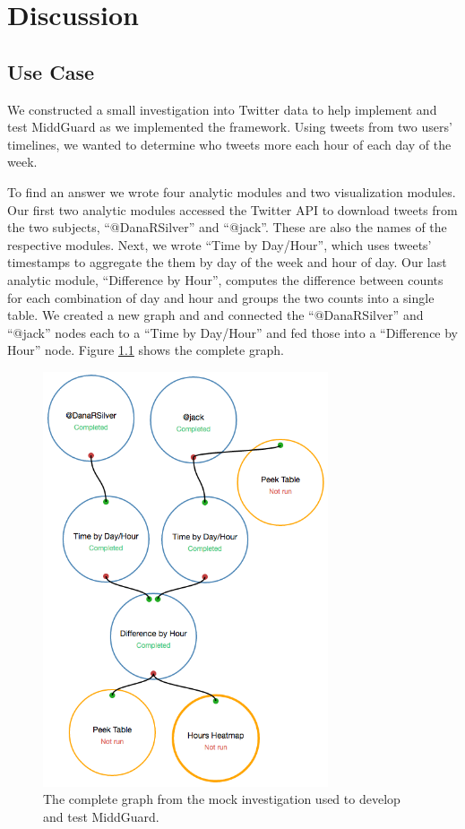 \documentclass[midd]{thesis}
\begin{document}
\chapter{Discussion}

\section{Use Case}

We constructed a small investigation into Twitter data to help implement and
test MiddGuard as we implemented the framework. Using tweets from two users'
timelines, we wanted to determine who tweets more each hour of each day of the
week.

To find an answer we wrote four analytic modules and two visualization modules.
Our first two analytic modules accessed the Twitter API to download tweets from
the two subjects, ``@DanaRSilver'' and ``@jack''. These are also the names of
the respective modules. Next, we wrote ``Time by Day/Hour'', which uses tweets'
timestamps to aggregate the them by day of the week and hour of day. Our last
analytic module, ``Difference by Hour'', computes the difference between counts
for each combination of day and hour and groups the two counts into a single
table. We created a new graph and and connected the ``@DanaRSilver'' and
``@jack'' nodes each to a ``Time by Day/Hour'' and fed those into a ``Difference
by Hour'' node. Figure \ref{fig:tweetanalysisgraph} shows the complete graph.

\begin{figure}[!ht]
  \centering
  \includegraphics[width=0.75\textwidth]{tweetanalysisgraph}
  \caption[The complete graph from a use case.]{The complete graph from the mock
  investigation used to develop and test MiddGuard.}
  \label{fig:tweetanalysisgraph}
\end{figure}
\end{document}
